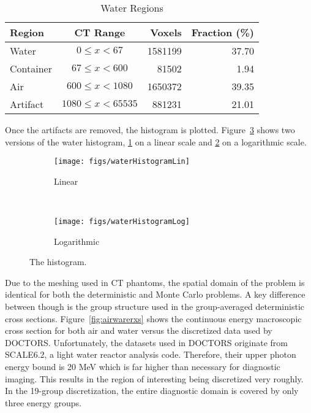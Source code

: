 \begin{table}[ht]
\caption{Water Regions}
\centering 
\begin{tabular}{l c r r}
\hline \hline   
Region    & CT Range & Voxels & Fraction (\%)\\ [0.5ex] 
\hline
Water     & $0 \leq x < 67$ & 1581199 & 37.70 \\
Container & $67 \leq x < 600$ & 81502 & 1.94 \\
Air       & $600 \leq x < 1080$ & 1650372  & 39.35 \\
Artifact  & $1080 \leq x < 65535$ & 881231 & 21.01 \\  [1ex]
\hline
\end{tabular}
\label{table:nonlin}
\end{table}

Once the artifacts are removed, the histogram is plotted. Figure~\ref{fig:waterHist} shows two versions of the water histogram, \ref{fig:waterHistLin} on a linear scale and \ref{fig:waterHistLog} on a logarithmic scale.

\begin{figure}
    \centering
    \begin{subfigure}[b]{0.45\textwidth}
        \texttt{[image: figs/waterHistogramLin]}
        \caption{Linear}
        \label{fig:waterHistLin}
    \end{subfigure}
    ~
    \begin{subfigure}[b]{0.45\textwidth}
        \texttt{[image: figs/waterHistogramLog]}
        \caption{Logarithmic}
        \label{fig:waterHistLog}
    \end{subfigure}
    \caption{The histogram.}\label{fig:waterHist}
\end{figure}

Due to the meshing used in CT phantoms, the spatial domain of the problem is identical for both the deterministic and Monte Carlo problems. A key difference between though is the group structure used in the group-averaged deterministic cross sections. Figure~\ref{fig:airwarerxs} shows the continuous energy macroscopic cross section for both air and water versus the discretized data used by DOCTORS. Unfortunately, the datasets used in DOCTORS originate from SCALE6.2, a light water reactor analysis code. Therefore, their upper photon energy bound is 20 MeV which is far higher than necessary for diagnostic imaging. This results in the region of interesting being discretized very roughly. In the 19-group discretization, the entire diagnostic domain is covered by only three energy groups.

